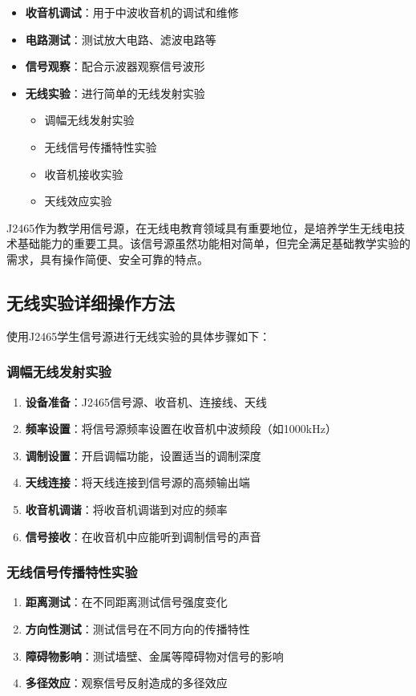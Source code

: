 \documentclass[12pt,UTF8]{ctexbook}
\begin{document}
\begin{itemize}[leftmargin=2cm]
	\item \textbf{收音机调试}：用于中波收音机的调试和维修
	\item \textbf{电路测试}：测试放大电路、滤波电路等
	\item \textbf{信号观察}：配合示波器观察信号波形
	\item \textbf{无线实验}：进行简单的无线发射实验
\begin{itemize}[leftmargin=1cm]
	\item 调幅无线发射实验
	\item 无线信号传播特性实验
	\item 收音机接收实验
	\item 天线效应实验
\end{itemize}
\end{itemize}

J2465作为教学用信号源，在无线电教育领域具有重要地位，是培养学生无线电技术基础能力的重要工具。该信号源虽然功能相对简单，但完全满足基础教学实验的需求，具有操作简便、安全可靠的特点。

\subsection{无线实验详细操作方法}
使用J2465学生信号源进行无线实验的具体步骤如下：

\subsubsection{调幅无线发射实验}
\begin{enumerate}[leftmargin=2cm]
	\item \textbf{设备准备}：J2465信号源、收音机、连接线、天线
	\item \textbf{频率设置}：将信号源频率设置在收音机中波频段（如1000kHz）
	\item \textbf{调制设置}：开启调幅功能，设置适当的调制深度
	\item \textbf{天线连接}：将天线连接到信号源的高频输出端
	\item \textbf{收音机调谐}：将收音机调谐到对应的频率
	\item \textbf{信号接收}：在收音机中应能听到调制信号的声音
\end{enumerate}

\subsubsection{无线信号传播特性实验}
\begin{enumerate}[leftmargin=2cm]
	\item \textbf{距离测试}：在不同距离测试信号强度变化
	\item \textbf{方向性测试}：测试信号在不同方向的传播特性
	\item \textbf{障碍物影响}：测试墙壁、金属等障碍物对信号的影响
	\item \textbf{多径效应}：观察信号反射造成的多径效应
\end{enumerate}
\end{document}
